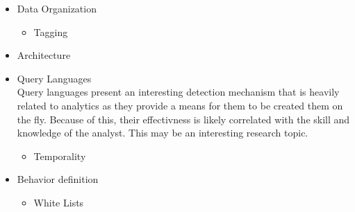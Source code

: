\documentclass[10pt]{IEEEtran}
\begin{document}
\begin{enumerate}
\begin{itemize}
             \item Data Organization
                \begin{itemize}
                    \item Tagging
                \end{itemize}
                \item Architecture
                \item Query Languages\cite{mukherjee1994network}
                \\ Query languages present an interesting detection mechanism that is heavily related to analytics as they provide a means for them to be created them on the fly. Because of this, their effectivness is likely correlated with the skill and knowledge of the analyst. This may be an interesting research topic.
                \begin{itemize}
                    \item Temporality \cite{abraham2015predictive}\cite{abraham2014cyber}
                \end{itemize}
                \item Behavior definition
                    \begin{itemize}                                  \item White Lists\cite{yen2013beehive}
                    \end{itemize}
        \end{itemize}
\end{enumerate}
\end{document}
